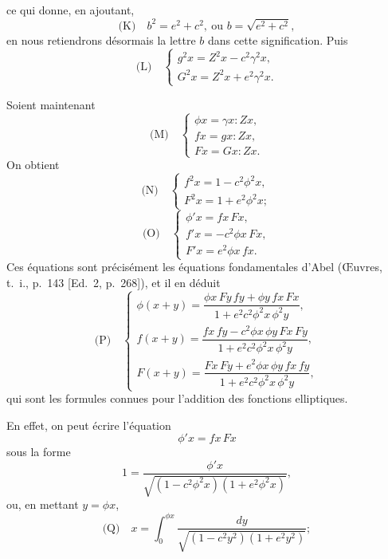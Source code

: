 \documentclass[12pt,a4paper]{article}
\begin{document}
\newpage
\setcounter{page}{173}

ce qui donne, en ajoutant,
\[
\text{(K)}\quad b^2 = e^2 + c^2,\ \text{ou } b = \sqrt{e^2 + c^2},
\]
en nous retiendrons d\'esormais la lettre $b$ dans cette signification. Puis
\[
\text{(L)}\quad
\begin{cases}
g^2 x = Z^2 x - c^2\gamma^2 x,\\
G^2 x = Z^2 x + e^2\gamma^2 x.
\end{cases}
\]

Soient maintenant
\[
\text{(M)}\quad
\begin{cases}
\phi x = \gamma x : Z x,\\
f x = g x : Z x,\\
F x = G x : Z x.
\end{cases}
\]
On obtient
\[
\text{(N)}\quad
\begin{cases}
f^2 x = 1 - c^2\phi^2 x,\\
F^2 x = 1 + e^2\phi^2 x;
\end{cases}
\]
\[
\text{(O)}\quad
\begin{cases}
\phi' x = f x\,F x,\\
f' x = -c^2 \phi x\,F x,\\
F' x = e^2 \phi x\,f x.
\end{cases}
\]
Ces \'equations sont pr\'ecis\'ement les \'equations fondamentales d'Abel ({\OE}uvres, t.~i., p.~143 [Ed.~2, p.~268]), et il en d\'eduit
\[
\text{(P)}\quad
\begin{cases}
\phi(x + y) = \dfrac{\phi x\,F y\,f y + \phi y\,f x\,F x}{1 + e^2 c^2 \phi^2 x\,\phi^2 y},\\[8pt]
f(x + y) = \dfrac{f x\,f y - c^2\phi x\,\phi y\,F x\,F y}{1 + e^2 c^2 \phi^2 x\,\phi^2 y},\\[8pt]
F(x + y) = \dfrac{F x\,F y + e^2\phi x\,\phi y\,f x\,f y}{1 + e^2 c^2 \phi^2 x\,\phi^2 y},
\end{cases}
\]
qui sont les formules connues pour l'addition des fonctions elliptiques.

En effet, on peut \'ecrire l'\'equation
\[
\phi' x = f x\,F x
\]
sous la forme
\[
1 = \frac{\phi' x}{\sqrt{(1 - c^2\phi^2 x)(1 + e^2\phi^2 x)}},
\]
ou, en mettant $y = \phi x$,
\[
\text{(Q)}\quad x = \int_0^{\phi x}\frac{dy}{\sqrt{(1 - c^2 y^2)(1 + e^2 y^2)}};
\]

\newpage
\setcounter{page}{174}
\end{document}

